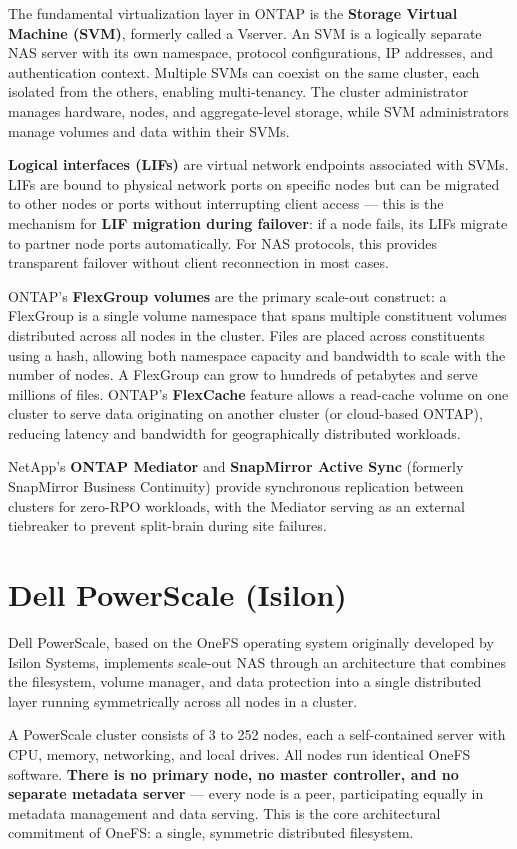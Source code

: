 The fundamental virtualization layer in ONTAP is the \textbf{Storage Virtual Machine (SVM)}, formerly called a Vserver. An SVM is a logically separate NAS server with its own namespace, protocol configurations, IP addresses, and authentication context. Multiple SVMs can coexist on the same cluster, each isolated from the others, enabling multi-tenancy. The cluster administrator manages hardware, nodes, and aggregate-level storage, while SVM administrators manage volumes and data within their SVMs.

\textbf{Logical interfaces (LIFs)} are virtual network endpoints associated with SVMs. LIFs are bound to physical network ports on specific nodes but can be migrated to other nodes or ports without interrupting client access --- this is the mechanism for \textbf{LIF migration during failover}: if a node fails, its LIFs migrate to partner node ports automatically. For NAS protocols, this provides transparent failover without client reconnection in most cases.

ONTAP's \textbf{FlexGroup volumes} are the primary scale-out construct: a FlexGroup is a single volume namespace that spans multiple constituent volumes distributed across all nodes in the cluster. Files are placed across constituents using a hash, allowing both namespace capacity and bandwidth to scale with the number of nodes. A FlexGroup can grow to hundreds of petabytes and serve millions of files. ONTAP's \textbf{FlexCache} feature allows a read-cache volume on one cluster to serve data originating on another cluster (or cloud-based ONTAP), reducing latency and bandwidth for geographically distributed workloads.

NetApp's \textbf{ONTAP Mediator} and \textbf{SnapMirror Active Sync} (formerly SnapMirror Business Continuity) provide synchronous replication between clusters for zero-RPO workloads, with the Mediator serving as an external tiebreaker to prevent split-brain during site failures.

\section{Dell PowerScale (Isilon)}
Dell PowerScale, based on the OneFS operating system originally developed by Isilon Systems, implements scale-out NAS through an architecture that combines the filesystem, volume manager, and data protection into a single distributed layer running symmetrically across all nodes in a cluster.

A PowerScale cluster consists of 3 to 252 nodes, each a self-contained server with CPU, memory, networking, and local drives. All nodes run identical OneFS software. \textbf{There is no primary node, no master controller, and no separate metadata server} --- every node is a peer, participating equally in metadata management and data serving. This is the core architectural commitment of OneFS: a single, symmetric distributed filesystem.

